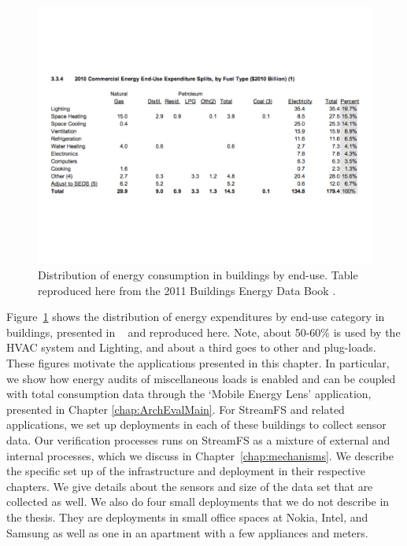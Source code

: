 \begin{figure}[t!] %
\centering
\includegraphics[width=1.0\columnwidth]{figs/end_use_fuel_type}
\caption{Distribution of energy consumption in buildings by end-use.  Table reproduced here from the 2011 Buildings 
Energy Data Book \cite{EIA}.}
\label{fig:end_use_energy}
\end{figure}

Figure~\ref{fig:end_use_energy} shows the distribution of energy expenditures by end-use category in buildings, presented in ~\cite{EIA} and
reproduced here.  Note, about 50-60\% is used by the HVAC system and Lighting, and about a third goes to other and plug-loads.  These figures
motivate the applications presented in this chapter.  In particular, we show how energy audits of miscellaneous loads is enabled and can be coupled
with total consumption data through the `Mobile Energy Lens' application, presented in Chapter \ref{chap:ArchEvalMain}.
For StreamFS and related applications, we set up deployments in each of these buildings to collect sensor data.  Our verification
processes runs on StreamFS as a mixture of external and internal processes, which we discuss in Chapter~\ref{chap:mechanisms}.
We describe the specific set up of the infrastructure and deployment in their respective chapters.  We give details 
about the sensors and size of the data set that are collected as well.
We also do four small deployments that we do not describe in the thesis.  They are deployments in small office spaces at 
Nokia, Intel, and Samsung as well as one in an apartment with a few appliances and meters.




